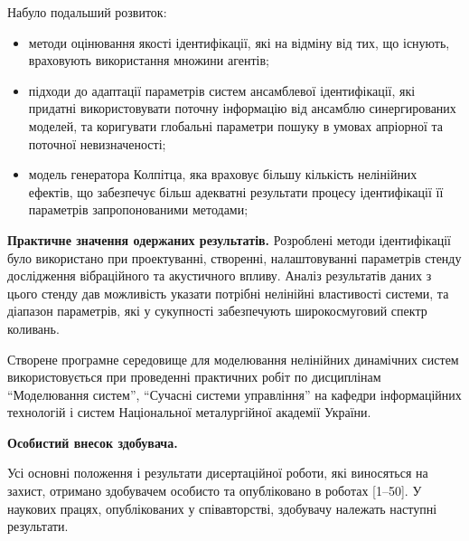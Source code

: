 \documentclass[a4paper,13pt]{atuaref}
\begin{document}
\noindent
Набуло подальший розвиток:
\begin{itemize}

  \item
  методи оцінювання якості ідентифікації,
  які на відміну від тих, що існують,
  враховують використання множини агентів;

  \item
  підходи до адаптації параметрів систем
  ансамблевої ідентифікації, які придатні використовувати поточну
  інформацію від ансамблю синергированих моделей, та коригувати глобальні
  параметри пошуку в умовах апріорної та поточної невизначеності;

  \item
    модель генератора Колпітца, яка враховує
    більшу кількість нелінійних ефектів,
    що забезпечує більш адекватні результати процесу
    ідентифікації її параметрів запропонованими методами;

\end{itemize}


\smallskip
\textbf{Практичне значення одержаних результатів.}
Розроблені методи ідентифікації було використано
при проектуванні, створенні, налаштовуванні параметрів
стенду дослідження вібраційного та акустичного впливу.
Аналіз результатів даних з цього стенду
дав можливість указати потрібні нелінійні властивості системи,
та діапазон параметрів, які у сукупності
забезпечують широкосмуговий спектр коливань.

Створене програмне середовище для моделювання нелінійних динамічних систем
використовується при проведенні практичних робіт по дисциплінам
``Моделювання систем'',
``Сучасні системи управління'' на кафедри інформаційних технологій
і систем Національної металургійної академії України.


\smallskip
\textbf{Особистий внесок здобувача.}

Усі основні положення і результати
дисертаційної роботи, які виносяться на захист, отримано здобувачем особисто та
опубліковано в роботах [1--50]. У наукових працях, опублікованих у співавторстві,
здобувачу належать наступні результати.

\end{document}
